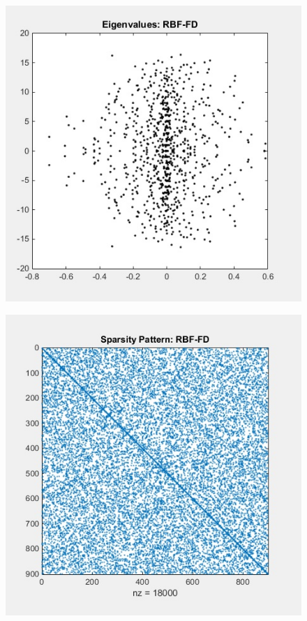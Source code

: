 \documentclass[11pt]{article}
\begin{document}
\begin{figure}[h!]
\centering
\begin{minipage}{.33\hsize}
  \centering
\includegraphics[scale=0.5]{FD_RBF_eigenvals.jpg}
\label{fig:rbfFDeigenvalues}
\end{minipage}%

\begin{minipage}{.33\hsize}
  \centering
\includegraphics[scale=0.5]{FD_RBF_sparse01.jpg}
\label{fig:rbfFDdiffmat}\
\end{minipage}


\end{figure}
\end{document}
